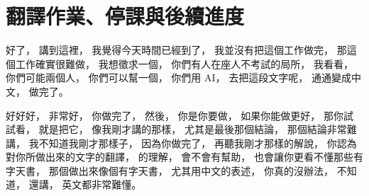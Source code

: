 \section{翻譯作業、停課與後續進度}

\hypertarget{w02:cue:2788}{}好了，
\hypertarget{w02:cue:2789}{}講到這裡，
\hypertarget{w02:cue:2790}{}我覺得今天時間已經到了，
\hypertarget{w02:cue:2791}{}我並沒有把這個工作做完，
\hypertarget{w02:cue:2792}{}那這個工作確實很難做，
\hypertarget{w02:cue:2793}{}我想徵求一個，
\hypertarget{w02:cue:2794}{}你們有人在座人不考試的局所，
\hypertarget{w02:cue:2795}{}我看看，
\hypertarget{w02:cue:2796}{}你們可能兩個人，
\hypertarget{w02:cue:2797}{}你們可以幫一個，
\hypertarget{w02:cue:2798}{}你們用 AI，
\hypertarget{w02:cue:2799}{}去把這段文字呢，
\hypertarget{w02:cue:2800}{}通通變成中文，
\hypertarget{w02:cue:2801}{}做完了。

\hypertarget{w02:cue:2802}{}好好好，
\hypertarget{w02:cue:2803}{}非常好，
\hypertarget{w02:cue:2804}{}你做完了，
\hypertarget{w02:cue:2805}{}然後，
\hypertarget{w02:cue:2806}{}你是你要做，
\hypertarget{w02:cue:2807}{}如果你能做更好，
\hypertarget{w02:cue:2808}{}那你試試看，
\hypertarget{w02:cue:2809}{}就是把它，
\hypertarget{w02:cue:2810}{}像我剛才講的那樣，
\hypertarget{w02:cue:2811}{}尤其是最後那個結論，
\hypertarget{w02:cue:2812}{}那個結論非常難講，
\hypertarget{w02:cue:2813}{}我不知道我剛才那樣子，
\hypertarget{w02:cue:2814}{}因為你做完了，
\hypertarget{w02:cue:2815}{}再聽我剛才那樣的解說，
\hypertarget{w02:cue:2816}{}你認為對你所做出來的文字的翻譯，
\hypertarget{w02:cue:2817}{}的理解，
\hypertarget{w02:cue:2818}{}會不會有幫助，
\hypertarget{w02:cue:2819}{}也會讓你更看不懂那些有字天書，
\hypertarget{w02:cue:2820}{}那個做出來像個有字天書，
\hypertarget{w02:cue:2821}{}尤其用中文的表述，
\hypertarget{w02:cue:2822}{}你真的沒辦法，
\hypertarget{w02:cue:2823}{}不知道，
\hypertarget{w02:cue:2824}{}還講，
\hypertarget{w02:cue:2825}{}英文都非常難懂。

